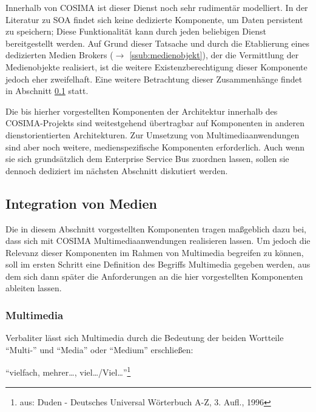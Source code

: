   Innerhalb von COSIMA ist dieser Dienst noch sehr rudimentär modelliert. In der Literatur zu SOA findet sich keine dedizierte Komponente, um Daten persistent zu speichern; Diese Funktionalität kann durch jeden beliebigen Dienst bereitgestellt werden. Auf Grund dieser Tatsache und durch die Etablierung eines dedizierten Medien Brokers ($\to$ \ref{ssub:medienobjekt}), der die Vermittlung der Medienobjekte realisiert, ist die weitere Existenzberechtigung dieser Komponente jedoch eher zweifelhaft. Eine weitere Betrachtung dieser Zusammenhänge findet in Abschnitt \ref{sub:integration_von_medien} statt.
  

  Die bis hierher vorgestellten Komponenten der Architektur innerhalb des COSIMA-Projekts sind weitestgehend übertragbar auf Komponenten in anderen dienstorientierten Architekturen. Zur Umsetzung von Multimediaanwendungen sind aber noch weitere, medienspezifische Komponenten erforderlich. Auch wenn sie sich grundsätzlich dem Enterprise Service Bus zuordnen lassen, sollen sie dennoch dediziert im nächsten Abschnitt diskutiert werden.


\subsection{Integration von Medien} %
\label{sub:integration_von_medien}

  Die in diesem Abschnitt vorgestellten Komponenten tragen maßgeblich dazu bei, dass sich mit COSIMA Multimediaanwendungen realisieren lassen. Um jedoch die Relevanz dieser Komponenten im Rahmen von Multimedia begreifen zu können, soll im ersten Schritt eine Definition des Begriffs Multimedia gegeben werden, aus dem sich dann später die Anforderungen an die hier vorgestellten Komponenten ableiten lassen.
  
\subsubsection{Multimedia} %
\label{ssub:definition_multimedia}
  
  Verbaliter lässt sich Multimedia durch die Bedeutung der beiden Wortteile "`Multi-"' und "`Media"' oder "`Medium"' erschließen:

  \begin{definition}[Multi-]\label{def:multi_}
    "`vielfach, mehrer\ldots, viel\ldots/Viel\ldots"'\footnote{aus: Duden - Deutsches Universal Wörterbuch A-Z, 3. Aufl., 1996}
  \end{definition}
  
